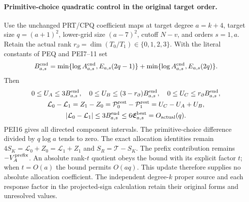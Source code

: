 \paragraph{Primitive-choice quadratic control in the original target order.}
Use the unchanged PRT/CPQ coefficient maps at target degree $a=k+4$,
target size $q=(a+1)^2$, lower-grid size $(a-7)^2$, cutoff $N-v$,
and orders $s=1,a$. Retain the actual rank
$r_\partial=\dim(T_0/T_1)\in\{0,1,2,3\}$.
With the literal constants of PEQ and PEI7--11 set
\[
 B^{\rm end}_{a,s}=
 \min\{\log A^{\rm end}_{a,s},E_{a,s}(2q-1)\}
 +\min\{\log A^{\rm end}_{a,s},E_{a,s}(2q)\}.
\]
Then
\[
 \begin{gathered}
 0\le U_A\le3B^{\rm end}_{a,s},\quad
 0\le U_B\le(3-r_\partial)B^{\rm end}_{a,s},\quad
 0\le U_C\le r_\partial B^{\rm end}_{a,s},\\
 \mathcal L_0-\mathcal L_1=Z_1-Z_0
     =\mathcal P^{\rm rest}_0-\mathcal P^{\rm rest}_1
     =U_C-U_A+U_B,\\
 |\mathcal L_0-\mathcal L_1|
 \le3B^{\rm end}_{a,s}\le6\mathfrak E^{\rm best}_{a,s}
       =O_{\rm actual}(q).
 \end{gathered}
\]
PEI16 gives all directed component intervals. The primitive-choice
difference divided by $q\log a$ tends to zero. The exact allocation
identities remain
$4S_K=\mathcal L_0+Z_0=\mathcal L_1+Z_1$ and
$S_R=\mathcal T-S_K$. The prefix contribution remains
$-V_A^{\rm prefix}$. An absolute rank-$t$ quotient obeys the bound
with its explicit factor $t$; when $t=O(a)$ the bound permits
$O(aq)$. This update therefore supplies no absolute allocation
coefficient. The independent degree-$k$ proper source and each
response factor in the projected-sign calculation retain their
original forms and unresolved values.
